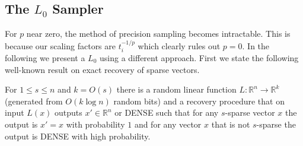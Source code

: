 
\subsection{The $L_0$ Sampler}
\label{sec:l0samp}
For $p$ near zero, the method of precision sampling becomes
intractable. This is because our scaling factors are
$t_i^{-1/p}$ which clearly rules out $p=0$. In the following we
present a $L_0$ using a different approach. First we state the
following well-known result on exact recovery of sparse vectors.
\begin{lemma}
\label{lem:sparse}
For $1\le s\le n$ and $k=O(s)$ there is a random linear function
$L:\mathbb R^n\to\mathbb R^k$ (generated from $O(k\log n)$ random bits) and a
recovery procedure that on input $L(x)$ outputs $x'\in\mathbb R^n$ or DENSE
such that for any $s$-sparse vector $x$ the output is $x'=x$ with probability
$1$ and for any vector $x$ that is not $s$-sparse the output is DENSE with
high probability.%
%
\end{lemma}

